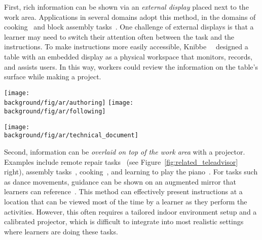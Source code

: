 First, rich information can be shown via an \emph{external display} placed next to the work area. Applications in several domains adopt this method, in the domains of cooking~\cite{Uriu:2012:PRM:2207676.2207695} and block assembly tasks~\cite{Gupta2012DuploTrack,Wu:2016:ARI:2856400.2856416}. One challenge of external displays is that a learner may need to switch their attention often between the task and the instructions. To make instructions more easily accessible, Knibbe~\ea{}~\cite{Knibbe:2015:SMI:2817721.2817741} designed a table with an embedded display as a physical workspace that monitors, records, and assists users. In this way, workers could review the information on the table's surface while making a project.

\begin{figure*}[t!]
  \centering
  \texttt{[image: \\background/fig/ar/authoring]}
  \texttt{[image: \\background/fig/ar/following]}
  \caption{TeleAdvisor~\cite{Gurevich:2012ko} provides an authoring interface (left) for an instructor to guide a remote worker through a repair task (right).}
  \label{fig:related_teleadvisor}
\end{figure*}

\begin{figure*}[t!]
  \centering
  \texttt{[image: \\background/fig/ar/technical\_document]}
  \caption{Work by Mohr \ea{}~\cite{Mohr:2015:RTD:2702123.2702490} automatically analyzes a technical document and augments a machine with AR animations in 3D to help novices operate an unfamiliar machine.}
  \label{fig:related_ar_annotation}
\end{figure*}

Second, information can be \emph{overlaid on top of the work area} with a projector. Examples include remote repair tasks~\cite{Gurevich:2012ko} (see Figure~\ref{fig:related_teleadvisor} right), assembly tasks~\cite{Kirk:2006:CRG:1124772.1124951}, cooking~\cite{Ju:2001:CIC:634067.634227}, and learning to play the piano~\cite{Xiao:2016:IEI:2858036.2858577}.
%
For tasks such as dance movements, guidance can be shown on an augmented mirror that learners can reference~\cite{Anderson:2013:YEM:2501988.2502045}.
%
This method can effectively present instructions at a location that can be viewed most of the time by a learner as they perform the activities. However, this often requires a tailored indoor environment setup and a calibrated projector, which is difficult to integrate into most realistic settings where learners are doing these tasks.

